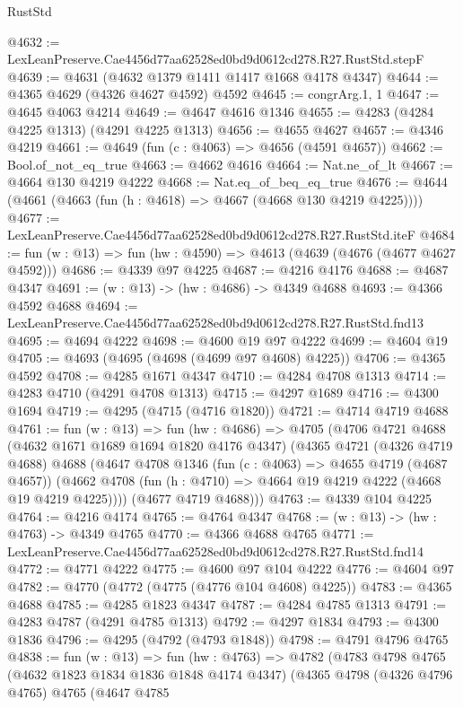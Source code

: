 \begin{lexlean}{RustStd}
\begin{coremodule}
@4632 := LexLeanPreserve.Cae4456d77aa62528ed0bd9d0612cd278.R27.RustStd.stepF
@4639 := @4631 (@4632 @1379 @1411 @1417 @1668 @4178 @4347)
@4644 := @4365 @4629 (@4326 @4627 @4592) @4592
@4645 := congrArg.{1, 1}
@4647 := @4645 @4063 @4214
@4649 := @4647 @4616 @1346
@4655 := @4283 (@4284 @4225 @1313) (@4291 @4225 @1313)
@4656 := @4655 @4627
@4657 := @4346 @4219
@4661 := @4649 (fun (c : @4063) => @4656 (@4591 @4657))
@4662 := Bool.of_not_eq_true
@4663 := @4662 @4616
@4664 := Nat.ne_of_lt
@4667 := @4664 @130 @4219 @4222
@4668 := Nat.eq_of_beq_eq_true
@4676 := @4644 (@4661 (@4663 (fun (h : @4618) => @4667 (@4668 @130 @4219 @4225))))
@4677 := LexLeanPreserve.Cae4456d77aa62528ed0bd9d0612cd278.R27.RustStd.iteF
@4684 := fun (w : @13) => fun (hw : @4590) => @4613 (@4639 (@4676 (@4677 @4627 @4592)))
@4686 := @4339 @97 @4225
@4687 := @4216 @4176
@4688 := @4687 @4347
@4691 := (w : @13) -> (hw : @4686) -> @4349 @4688
@4693 := @4366 @4592 @4688
@4694 := LexLeanPreserve.Cae4456d77aa62528ed0bd9d0612cd278.R27.RustStd.fnd13
@4695 := @4694 @4222
@4698 := @4600 @19 @97 @4222
@4699 := @4604 @19
@4705 := @4693 (@4695 (@4698 (@4699 @97 @4608) @4225))
@4706 := @4365 @4592
@4708 := @4285 @1671 @4347
@4710 := @4284 @4708 @1313
@4714 := @4283 @4710 (@4291 @4708 @1313)
@4715 := @4297 @1689
@4716 := @4300 @1694
@4719 := @4295 (@4715 (@4716 @1820))
@4721 := @4714 @4719 @4688
@4761 := fun (w : @13) =>
  fun (hw : @4686) =>
  @4705
    (@4706
      @4721
      @4688
      (@4632 @1671 @1689 @1694 @1820 @4176 @4347)
      (@4365
        @4721
        (@4326 @4719 @4688)
        @4688
        (@4647
          @4708
          @1346
          (fun (c : @4063) => @4655 @4719 (@4687 @4657))
          (@4662 @4708 (fun (h : @4710) => @4664 @19 @4219 @4222 (@4668 @19 @4219 @4225))))
        (@4677 @4719 @4688)))
@4763 := @4339 @104 @4225
@4764 := @4216 @4174
@4765 := @4764 @4347
@4768 := (w : @13) -> (hw : @4763) -> @4349 @4765
@4770 := @4366 @4688 @4765
@4771 := LexLeanPreserve.Cae4456d77aa62528ed0bd9d0612cd278.R27.RustStd.fnd14
@4772 := @4771 @4222
@4775 := @4600 @97 @104 @4222
@4776 := @4604 @97
@4782 := @4770 (@4772 (@4775 (@4776 @104 @4608) @4225))
@4783 := @4365 @4688
@4785 := @4285 @1823 @4347
@4787 := @4284 @4785 @1313
@4791 := @4283 @4787 (@4291 @4785 @1313)
@4792 := @4297 @1834
@4793 := @4300 @1836
@4796 := @4295 (@4792 (@4793 @1848))
@4798 := @4791 @4796 @4765
@4838 := fun (w : @13) =>
  fun (hw : @4763) =>
  @4782
    (@4783
      @4798
      @4765
      (@4632 @1823 @1834 @1836 @1848 @4174 @4347)
      (@4365
        @4798
        (@4326 @4796 @4765)
        @4765
        (@4647
          @4785

\end{coremodule}
\end{lexlean}
